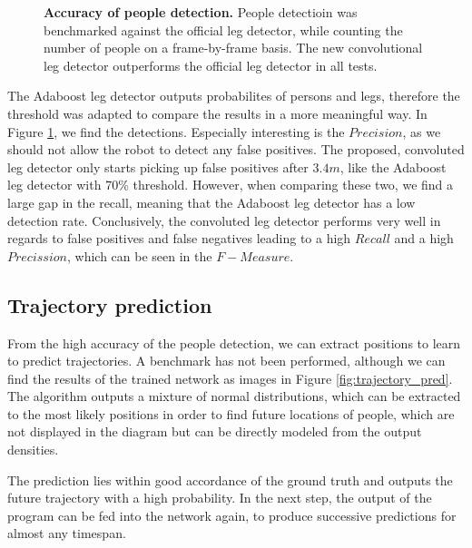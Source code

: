 \begin{figure}
	\normalsize
	\begin{center}
		
	\end{center}
	\caption{\textbf{Accuracy of people detection.} People detectioin was benchmarked against the official leg detector, while counting the number of people on a frame-by-frame basis. The new convolutional leg detector outperforms the official leg detector in all tests.}
	\label{fig:people_detection}
\end{figure}

The Adaboost leg detector outputs probabilites of persons and legs, therefore the threshold was adapted to compare the results in a more meaningful way. In Figure \ref{fig:people_detection}, we find the detections. Especially interesting is the $Precision$, as we should not allow the robot to detect any false positives. The proposed, convoluted leg detector only starts picking up false positives after $3.4 m$, like the Adaboost leg detector with 70\% threshold. However, when comparing these two, we find a large gap in the recall, meaning that the Adaboost leg detector has a low detection rate.
Conclusively, the convoluted leg detector performs very well in regards to false positives and false negatives leading to a high $Recall$ and a high $Precission$, which can be seen in the $F-Measure$.


\subsection{Trajectory prediction}

From the high accuracy of the people detection, we can extract positions to learn to predict trajectories. A benchmark has not been performed, although we can find the results of the trained network as images in Figure \ref{fig:trajectory_pred}. The algorithm outputs a mixture of normal distributions, which can be extracted to the most likely positions in order to find future locations of people, which are not displayed in the diagram but can be directly modeled from the output densities.

The prediction lies within good accordance of the ground truth and outputs the future trajectory with a high probability. In the next step, the output of the program can be fed into the network again, to produce successive predictions for almost any timespan.


